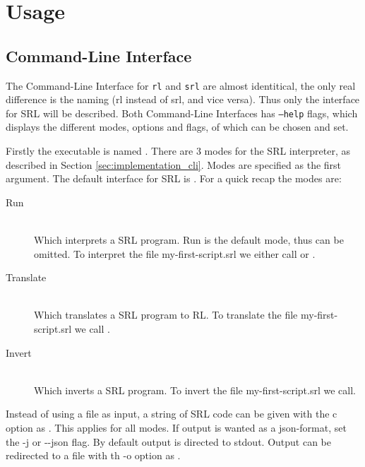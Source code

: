 \section{Usage}

\subsection{Command-Line Interface}

The Command-Line Interface for \texttt{rl} and \texttt{srl} are almost identitical, the only real difference is the naming (rl instead of srl, and vice versa).
Thus only the interface for SRL will be described.
Both Command-Line Interfaces has \texttt{--help} flags, which displays the different modes, options and flags, of which can be chosen and set.

\noindent
Firstly the executable is named .
There are 3 modes for the SRL interpreter, as described in Section \ref{sec:implementation_cli}.
Modes are specified as the first argument. The default interface for SRL is .
For a quick recap the modes are:

\begin{description}

  \item[Run]~\\
    Which interprets a SRL program. Run is the default mode, thus can be omitted.
    To interpret the file my-first-script.srl we either call  or .

  \item[Translate]~\\
    Which translates a SRL program to RL.
    To translate the file my-first-script.srl we call .

  \item[Invert]~\\
    Which inverts a SRL program.
    To invert the file my-first-script.srl we call\newline{}.

\end{description}

Instead of using a file as input, a string of SRL code can be given with the c option as . This applies for all modes.
If output is wanted as a json-format, set the -j or {-}{-}json flag.
By default output is directed to stdout. Output can be redirected to a file with th -o option as .

